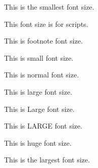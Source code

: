 \documentclass{article}
\begin{document}
	\tiny This is the smallest font size.
	
	\scriptsize This font size is for scripts.
	
	\footnotesize This is footnote font size.
	
	\small This is small font size.
	
	\normalsize This is normal font size.
	
	\large This is large font size.
	
	\Large This is Large font size.
	
	\LARGE This is LARGE font size.
	
	\huge This is huge font size.
	
	\Huge This is the largest font size.
\end{document}
